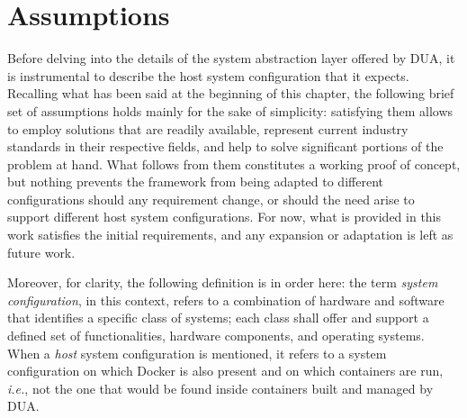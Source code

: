 \section{Assumptions}
\label{sec:dua_assumptions}
Before delving into the details of the system abstraction layer offered by DUA, it is instrumental to describe the host system configuration that it expects. Recalling what has been said at the beginning of this chapter, the following brief set of assumptions holds mainly for the sake of simplicity: satisfying them allows to employ solutions that are readily available, represent current industry standards in their respective fields, and help to solve significant portions of the problem at hand. What follows from them constitutes a working proof of concept, but nothing prevents the framework from being adapted to different configurations should any requirement change, or should the need arise to support different host system configurations. For now, what is provided in this work satisfies the initial requirements, and any expansion or adaptation is left as future work.

Moreover, for clarity, the following definition is in order here: the term \emph{system configuration}, in this context, refers to a combination of hardware and software that identifies a specific class of systems; each class shall offer and support a defined set of functionalities, hardware components, and operating systems. When a \emph{host} system configuration is mentioned, it refers to a system configuration on which Docker is also present and on which containers are run, \emph{i.e.}, not the one that would be found inside containers built and managed by DUA.

